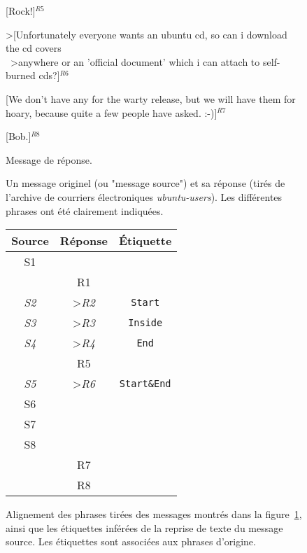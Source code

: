 \begin{figure}
\begin{minipage}{\textwidth}
{{                [Rock!]$^{R5}$\vspace{0.3cm}

                \textgreater [Unfortunately everyone wants an ubuntu cd, so can i download the cd covers \\ \ 
                \textgreater anywhere or an 'official document' which i can attach to self-burned cds?]$^{R6}$\vspace{0.3cm}

                [We don't have any for the warty release, but we will have them for hoary, %
                because quite a few people have asked. :-)]$^{R7}$\vspace{0.3cm}

                [Bob.]$^{R8}$ %
                \vspace{3mm}
            }
        }
        
        \begin{center}
        Message de réponse.
        \end{center}
    \end{minipage}

    \caption{Un message originel (ou "message source") et sa réponse (tirés de l'archive de courriers électroniques \textit{ubuntu-users}). Les différentes phrases ont été clairement indiquées.}
    \label{fig:exampleSourceReplyMessage}
\end{figure}

\begin{figure}
    \small\centering
    \begin{tabular}{|*{2}{c}c|}
    \toprule
    \textbf{Source} & \textbf{Réponse} & \textbf{Étiquette} \\
        \midrule
        S1  & & \\
        & R1 & \\
        \textit{S2}  & \textgreater \textit{R2}& \texttt{Start} \\
        \textit{S3}  & \textgreater \textit{R3}& \texttt{Inside} \\
        \textit{S4}  & \textgreater \textit{R4}& \texttt{End} \\
        & R5 & \\
        \textit{S5}  & \textgreater \textit{R6} & \texttt{Start\&End} \\
        S6 &  & \\ 
        S7 &  & \\
        S8 &  & \\
        & R7 & \\
        & R8 & \\
        \bottomrule
    \end{tabular}

    \caption{Alignement des phrases tirées des messages montrés dans la figure~\ref{fig:exampleSourceReplyMessage}, ainsi que les étiquettes inférées de la reprise de texte du message source. Les étiquettes sont associées aux phrases d'origine.}
    \label{fig:exampleSegmentationLabels}
\end{figure}

